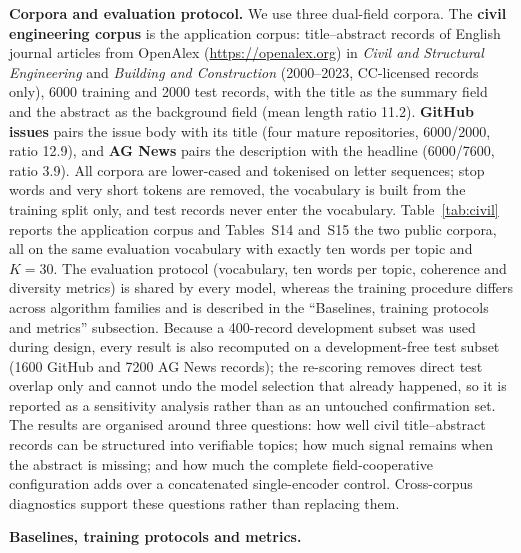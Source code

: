 \documentclass[Journal,letterpaper,NoLists]{ascelike-new}
\begin{document}
\noindent\textbf{Corpora and evaluation protocol.} We use three dual-field corpora. The \textbf{civil engineering corpus} is the application corpus:
title--abstract records of English journal articles from OpenAlex \cite{openalex2022} (\url{https://openalex.org}) in \emph{Civil and Structural
Engineering} and \emph{Building and Construction} (2000--2023, CC-licensed records only), 6000
training and 2000 test records, with the title as the summary field and the abstract as the
background field (mean length ratio 11.2). \textbf{GitHub issues} \cite{openindex2026} pairs the
issue body with its title (four mature repositories, 6000/2000, ratio 12.9), and \textbf{AG News}
\cite{zhang2015char} pairs the description
with the headline (6000/7600, ratio 3.9). All corpora are lower-cased and tokenised on letter
sequences; stop words and very short tokens are removed, the vocabulary is built from the training
split only, and test records never enter the vocabulary. Table~\ref{tab:civil} reports the
application corpus and Tables~S14 and~S15 the two public corpora, all on
the same evaluation vocabulary with exactly ten words per topic and $K=30$. The evaluation
protocol (vocabulary, ten words per topic, coherence and
diversity metrics) is shared by every model, whereas the training procedure differs across
algorithm families and is described in the ``Baselines, training protocols and metrics'' subsection. Because a 400-record
development subset was used during design, every result is also
recomputed on a development-free test subset (1600 GitHub and 7200 AG News records); the
re-scoring removes direct test overlap only and cannot undo the model selection that already
happened, so it is reported as a sensitivity analysis rather than as an untouched confirmation
set. The results are organised around three questions: how well civil title--abstract records can
be structured into verifiable topics; how much signal remains when the abstract is missing; and
how much the complete field-cooperative configuration adds over a concatenated single-encoder
control. Cross-corpus diagnostics support these questions rather than replacing them.

\noindent\textbf{Baselines, training protocols and metrics.} \label{sec:protocol}
\end{document}
